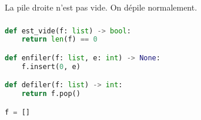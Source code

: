 \documentclass[svgnames,11pt]{beamer}
\begin{document}
\begin{frame}
    \begin{center}
    \end{center}
    \begin{center}
        La pile droite n'est pas vide. On dépile normalement.
    \end{center}
\end{frame}
\begin{frame}[fragile]
    \frametitle{}

    \begin{center}
        \begin{lstlisting}[language=Python , basicstyle=\ttfamily\small, xleftmargin=2em, xrightmargin=2em]
def est_vide(f: list) -> bool:
    return len(f) == 0

def enfiler(f: list, e: int) -> None:
    f.insert(0, e)

def defiler(f: list) -> int:
    return f.pop()

f = []
\end{lstlisting}
        \label{CODE}
    \end{center}

\end{frame}
\end{document}
